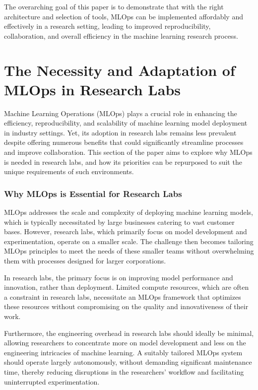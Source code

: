 The overarching goal of this paper is to demonstrate that with the right architecture and selection of tools, MLOps can be implemented affordably and effectively in a research setting, leading to improved reproducibility, collaboration, and overall efficiency in the machine learning research process.


\section{The Necessity and Adaptation of MLOps in Research Labs \label{necessity}}

Machine Learning Operations (MLOps) plays a crucial role in enhancing the efficiency, reproducibility, and scalability of machine learning model deployment in industry settings. Yet, its adoption in research labs remains less prevalent despite offering numerous benefits that could significantly streamline processes and improve collaboration. This section of the paper aims to explore why MLOps is needed in research labs, and how its priorities can be repurposed to suit the unique requirements of such environments.


\subsubsection{Why MLOps is Essential for Research Labs \label{why-mlops}}

MLOps addresses the scale and complexity of deploying machine learning models, which is typically necessitated by large businesses catering to vast customer bases. However, research labs, which primarily focus on model development and experimentation, operate on a smaller scale. The challenge then becomes tailoring MLOps principles to meet the needs of these smaller teams without overwhelming them with processes designed for larger corporations.

In research labs, the primary focus is on improving model performance and innovation, rather than deployment. Limited compute resources, which are often a constraint in research labs, necessitate an MLOps framework that optimizes these resources without compromising on the quality and innovativeness of their work.

Furthermore, the engineering overhead in research labs should ideally be minimal, allowing researchers to concentrate more on model development and less on the engineering intricacies of machine learning. A suitably tailored MLOps system should operate largely autonomously, without demanding significant maintenance time, thereby reducing disruptions in the researchers' workflow and facilitating uninterrupted experimentation.

